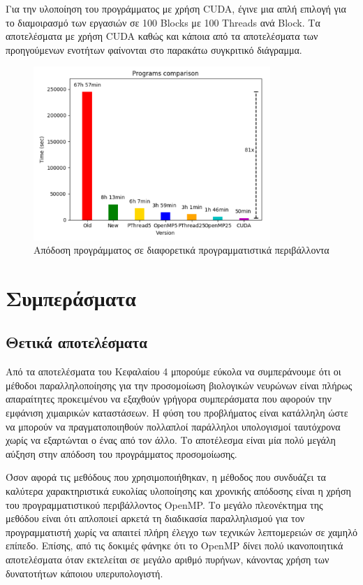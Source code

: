 \documentclass[12pt,a4paper]{article}
\begin{document}
Για την υλοποίηση του προγράμματος με χρήση CUDA, έγινε μια απλή επιλογή για το διαμοιρασμό των εργασιών σε 100 Blocks με 100 Threads ανά Block. Τα αποτελέσματα με χρήση CUDA καθώς και κάποια από τα αποτελέσματα των προηγούμενων ενοτήτων φαίνονται στο παρακάτω συγκριτικό διάγραμμα.

\begin{figure}[H]
\centering
\includegraphics[width=0.8\textwidth]{Figures/total.png}
\caption{Απόδοση προγράμματος σε διαφορετικά προγραμματιστικά περιβάλλοντα}
\end{figure}  

\newpage

\section{Συμπεράσματα}

\subsection{Θετικά αποτελέσματα}

Από τα αποτελέσματα του Κεφαλαίου 4 μπορούμε εύκολα να συμπεράνουμε ότι οι μέθοδοι παραλληλοποίησης για την προσομοίωση βιολογικών νευρώνων είναι πλήρως απαραίτητες προκειμένου να εξαχθούν γρήγορα συμπεράσματα που αφορούν την εμφάνιση χιμαιρικών καταστάσεων. Η φύση του προβλήματος είναι κατάλληλη ώστε να μπορούν να πραγματοποιηθούν πολλαπλοί παράλληλοι υπολογισμοί ταυτόχρονα χωρίς να εξαρτώνται ο ένας από τον άλλο. Το αποτέλεσμα είναι μία πολύ μεγάλη αύξηση στην απόδοση του προγράμματος προσομοίωσης.

Όσον αφορά τις μεθόδους που χρησιμοποιήθηκαν, η μέθοδος που συνδυάζει τα καλύτερα χαρακτηριστικά ευκολίας υλοποίησης και χρονικής απόδοσης είναι η χρήση του προγραμματιστικού περιβάλλοντος OpenMP. Το μεγάλο πλεονέκτημα της μεθόδου είναι ότι απλοποιεί αρκετά τη διαδικασία παραλληλισμού για τον προγραμματιστή χωρίς να απαιτεί πλήρη έλεγχο των τεχνικών λεπτομερειών σε χαμηλό επίπεδο. Επίσης, από τις δοκιμές φάνηκε ότι το OpenMP δίνει πολύ ικανοποιητικά αποτελέσματα όταν εκτελείται σε μεγάλο αριθμό πυρήνων, κάνοντας χρήση των δυνατοτήτων κάποιου υπερυπολογιστή.
\end{document}
